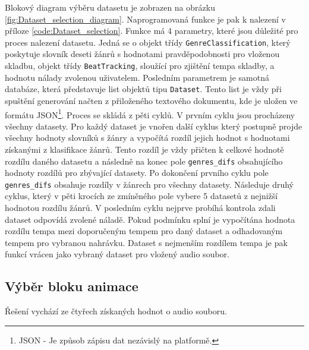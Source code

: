 Blokový diagram výběru datasetu je zobrazen na obrázku \ref{fig:Dataset_selection_diagram}.  Naprogramovaná funkce je pak k nalezení v příloze \ref{code:Dataset_selection}. Funkce má 4 parametry, které jsou důležité pro proces nalezení datasetu. Jedná se o objekt třídy \texttt{GenreClassification}, který poskytuje slovník deseti žánrů s hodnotami pravděpodobnosti pro vloženou skladbu, objekt třídy \texttt{BeatTracking}, sloužící pro zjištění tempa skladby, a hodnotu nálady zvolenou uživatelem. Posledním parametrem je samotná databáze, která představuje list objektů tipu \texttt{Dataset}. Tento list je vždy při spuštění generování načten z přiloženého textového dokumentu, kde je uložen ve formátu \acs{JSON}\footnote{JSON - Je způsob zápisu dat nezávislý na platformě.\cite{JSON}}. Proces se skládá z pěti cyklů. V prvním cyklu jsou procházeny všechny datasety. Pro každý dataset je vnořen další cyklus který postupně projde všechny hodnoty slovníků s žánry a vypočítá rozdíl jejich hodnot s hodnotami získanými z klasifikace žánrů. Tento rozdíl je vždy přičten k celkové hodnotě rozdílu daného datasetu a následně na konec pole \texttt{genres\_difs} obsahujícího hodnoty rozdílů pro zbývající datasety. Po dokončení prvního cyklu pole \texttt{genres\_difs} obsahuje rozdíly v žánrech pro všechny datasety. Následuje druhý cyklus, který v pěti krocích ze zmíněného pole vybere 5 datasetů z nejnižší hodnotou rozdílu žánrů. V posledním cyklu nejprve probíhá kontrola zdali dataset odpovídá zvolené náladě. Pokud podmínku splní je vypočítána hodnota rozdílu tempa mezi doporučeným tempem pro daný dataset a odhadovaným tempem pro vybranou nahrávku. Dataset s nejmenším rozdílem tempa je pak funkcí vrácen jako vybraný dataset pro vložený audio soubor. 

\subsection{Výběr bloku animace} \label{sec:Vyber_bloku_animace}

Řešení vychází ze čtyřech získaných hodnot o audio souboru.

